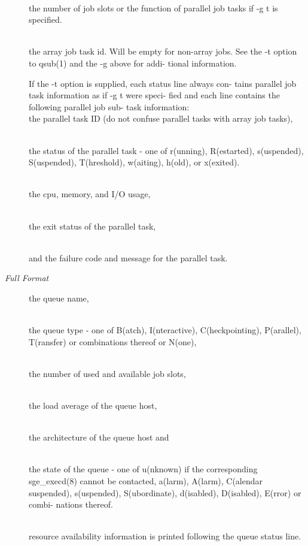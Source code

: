 \documentclass[11pt,final,oneside]{fithesis}
\begin{document}
\begin{description}
     \\  the number of job slots or the function of  parallel  job
        tasks if -g t is specified.

     \\  the array job task id. Will be empty for non-array  jobs.
        See  the  -t option to qsub(1) and the -g above for addi-
        tional information.

     If the -t option is supplied, each status line  always  con-
     tains  parallel  job task information as if -g t were speci-
     fied and each line contains the following parallel job  sub-
     task information:
     \\  the parallel task ID (do not confuse parallel tasks  with
        array job tasks),

     \\  the status of the  parallel  task  -  one  of  r(unning),
        R(estarted),   s(uspended),   S(uspended),   T(hreshold),
        w(aiting), h(old), or x(exited).

     \\  the cpu, memory, and I/O usage,

     \\ the exit status of the parallel task,

     \\  and the failure code and message for the parallel task.
\item[\emph{Full Format}]
the queue name,

     \\  the  queue  type  -  one   of   B(atch),   I(nteractive),
        C(heckpointing),  P(arallel),  T(ransfer) or combinations
        thereof or N(one),

     \\  the number of used and available job slots,

     \\  the load average of the queue host,

     \\  the architecture of the queue host and

     \\  the state  of  the  queue  -  one  of  u(nknown)  if  the
        corresponding  sge_execd(8) cannot be contacted, a(larm),
        A(larm),     C(alendar      suspended),      s(uspended),
        S(ubordinate),  d(isabled), D(isabled), E(rror) or combi-
        nations thereof.

     \\resource availability information
     is  printed  following  the  queue  status  line.  


\end{description}
\end{document}
